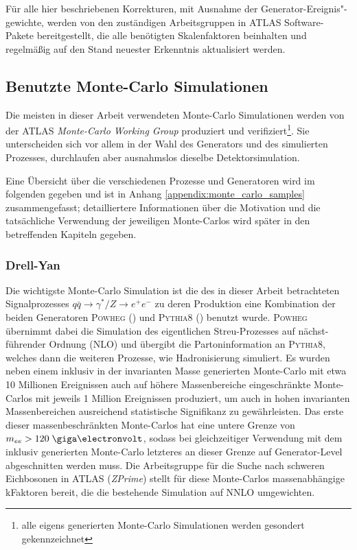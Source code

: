 Für alle hier beschriebenen Korrekturen, mit Ausnahme der
Generator-Ereignis"-gewichte, werden von den zuständigen Arbeitsgruppen in ATLAS
Software-Pakete bereitgestellt, die alle benötigten Skalenfaktoren beinhalten
und regelmäßig auf den Stand neuester Erkenntnis aktualisiert werden.



\subsection{Benutzte Monte-Carlo Simulationen}
\label{used_mc_samples}
Die meisten in dieser Arbeit verwendeten Monte-Carlo Simulationen werden von
der ATLAS \textit{Monte-Carlo Working Group} produziert und
verifiziert\footnote{alle eigens generierten Monte-Carlo Simulationen werden
gesondert gekennzeichnet}. Sie unterscheiden sich vor allem in der Wahl des
Generators und des simulierten Prozesses, durchlaufen aber ausnahmslos dieselbe
Detektorsimulation.

Eine Übersicht über die verschiedenen Prozesse und Generatoren wird im
folgenden gegeben und ist in Anhang \ref{appendix:monte_carlo_samples}
zusammengefasst; detailliertere Informationen über die Motivation und die
tatsächliche Verwendung der jeweiligen Monte-Carlos wird später in den
betreffenden Kapiteln gegeben.

\subsubsection*{Drell-Yan}
Die wichtigste Monte-Carlo Simulation ist die des in dieser Arbeit betrachteten
Signalprozesses $q\bar q \rightarrow \gamma^*/Z \rightarrow e^+e^-$ zu deren
Produktion eine Kombination der beiden Generatoren \textsc{Powheg}
(\cite{Alioli:2010xd}) und \textsc{Pythia8} (\cite{Sjostrand:2007gs}) benutzt
wurde. \textsc{Powheg} übernimmt dabei die Simulation des eigentlichen
Streu-Prozesses auf nächst-führender Ordnung (NLO) und übergibt die
Partoninformation an \textsc{Pythia8}, welches dann die weiteren Prozesse, wie
Hadronisierung simuliert. Es wurden neben einem inklusiv in der invarianten
Masse generierten Monte-Carlo mit etwa 10 Millionen Ereignissen auch auf höhere
Massenbereiche eingeschränkte Monte-Carlos mit jeweils 1 Million Ereignissen
produziert, um auch in hohen invarianten Massenbereichen ausreichend
statistische Signifikanz zu gewährleisten. Das erste dieser massenbeschränkten
Monte-Carlos hat eine untere Grenze von $m_{ee} > 120 \GeV$, sodass bei
gleichzeitiger Verwendung mit dem inklusiv generierten Monte-Carlo letzteres an
dieser Grenze auf Generator-Level abgeschnitten werden muss. Die Arbeitsgruppe
für die Suche nach schweren Eichbosonen in ATLAS (\textit{ZPrime}) stellt für
diese Monte-Carlos massenabhängige kFaktoren bereit, die die bestehende
Simulation auf NNLO umgewichten.

